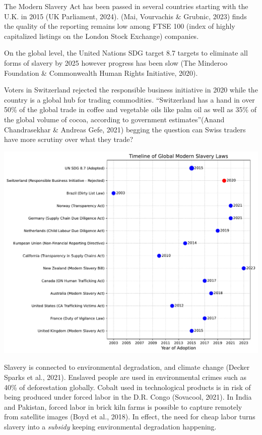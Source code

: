 \documentclass[
  letterpaper,
  DIV=11,
  numbers=noendperiod]{scrartcl}
\begin{document}
The Modern Slavery Act has been passed in several countries starting
with the U.K. in 2015 (UK Parliament, 2024). (Mai, Vourvachis \&
Grubnic, 2023) finds the quality of the reporting remains low among FTSE
100 (index of highly capitalized listings on the London Stock Exchange)
companies.

On the global level, the United Nations SDG target 8.7 targets to
eliminate all forms of slavery by 2025 however progress has been slow
(The Minderoo Foundation \& Commonwealth Human Rights Initiative, 2020).

Voters in Switzerland rejected the responsible business initiative in
2020 while the country is a global hub for trading commodities.
``Switzerland has a hand in over 50\% of the global trade in coffee and
vegetable oils like palm oil as well as 35\% of the global volume of
cocoa, according to government estimates''(Anand Chandrasekhar \&
Andreas Gefe, 2021) begging the question can Swiss traders have more
scrutiny over what they trade?

\includegraphics{_thesis_files/figure-pdf/cell-63-output-1.pdf}

Slavery is connected to environmental degradation, and climate change
(Decker Sparks et al., 2021). Enslaved people are used in environmental
crimes such as 40\% of deforestation globally. Cobalt used in
technological products is in risk of being produced under forced labor
in the D.R. Congo (Sovacool, 2021). In India and Pakistan, forced labor
in brick kiln farms is possible to capture remotely from satellite
images (Boyd et al., 2018). In effect, the need for cheap labor turns
slavery into a \emph{subsidy} keeping environmental degradation
happening.
\end{document}
